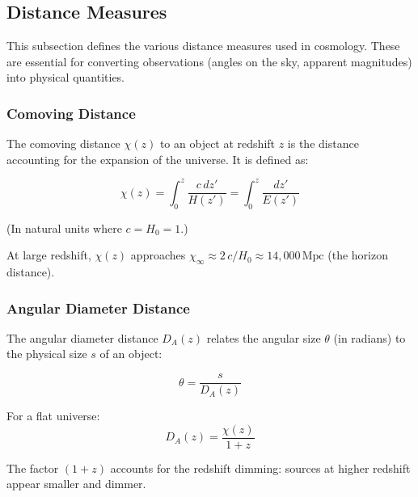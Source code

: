 \subsection{Distance Measures}\label{subsec:background_distance}

This subsection defines the various distance measures used in cosmology. These are essential for converting observations (angles on the sky, apparent magnitudes) into physical quantities.

\subsubsection{Comoving Distance}

The comoving distance $\chi(z)$ to an object at redshift $z$ is the distance accounting for the expansion of the universe. It is defined as:

\begin{equation}
\chi(z) = \int_0^z \frac{c \, dz'}{H(z')} = \int_0^z \frac{dz'}{E(z')}
\label{eq:comoving_distance}
\end{equation}

(In natural units where $c = H_0 = 1$.)

At large redshift, $\chi(z)$ approaches $\chi_\infty \approx 2 \, c / H_0 \approx 14,000 \, \mathrm{Mpc}$ (the horizon distance).


\subsubsection{Angular Diameter Distance}

The angular diameter distance $D_A(z)$ relates the angular size $\theta$ (in radians) to the physical size $s$ of an object:

\begin{equation}
\theta = \frac{s}{D_A(z)}
\end{equation}

For a flat universe:
\begin{equation}
D_A(z) = \frac{\chi(z)}{1+z}
\label{eq:D_A}
\end{equation}

The factor $(1+z)$ accounts for the redshift dimming: sources at higher redshift appear smaller and dimmer.

